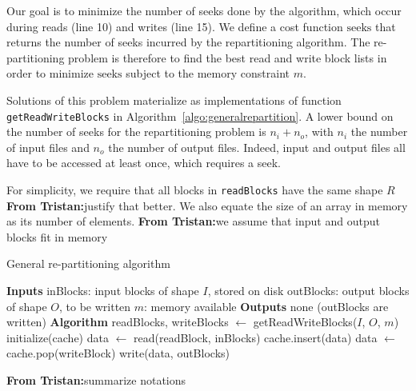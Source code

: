 \documentclass[sigconf, nonacm]{acmart}
\newcommand{\tristan}[1]{\color{orange}\textbf{From Tristan:}#1\color{black}}
\begin{document}
{Our goal is to minimize the number of seeks done by the algorithm, which
occur during reads (line 10) and writes (line 15). We define a cost
function $\mathrm{seeks}$ that returns the number of seeks incurred by the
repartitioning algorithm. 
The re-partitioning problem is therefore to find
the best read and write block lists in order to minimize $\mathrm{seeks}$
subject to the memory constraint $m$. 


Solutions of this problem materialize as implementations of function
\texttt{getReadWriteBlocks} in Algorithm~\ref{algo:generalrepartition}. A
lower bound on the number of seeks for the repartitioning problem is $n_i +
n_o$, with $n_i$ the number of input files and $n_o$ the number of output
files. Indeed, input and output files all have to be accessed at least
once, which requires a seek.

For simplicity, we require that all blocks in \texttt{readBlocks} have
the same shape $R$ \tristan{justify that better}. We also equate the size of an
array in memory as its number of elements.
\tristan{we assume that input and output blocks fit in memory}

\begin{algorithm}
  \caption{General re-partitioning algorithm}
  \label{algo:generalrepartition}
  \begin{algorithmic}[1]
    \STATE \textbf{Inputs}
    \STATE inBlocks: input blocks of shape $I$, stored on disk
    \STATE outBlocks: output blocks of shape $O$, to be written
    \STATE $m$: memory available
    \STATE
    \STATE \textbf{Outputs}
    \STATE none (outBlocks are written)
    \STATE
    \STATE \textbf{Algorithm}
    \STATE readBlocks, writeBlocks $\leftarrow$ getReadWriteBlocks($I$, $O$, $m$)
    \STATE initialize(cache)
      \STATE data $\leftarrow$ read(readBlock, inBlocks)
      \STATE cache.insert(data)
          \STATE data $\leftarrow$ cache.pop(writeBlock)
          \STATE write(data, outBlocks)
        \ENDIF
      \ENDFOR
    \ENDFOR

  \end{algorithmic}
\end{algorithm}

\tristan{summarize notations}

}
\end{document}
